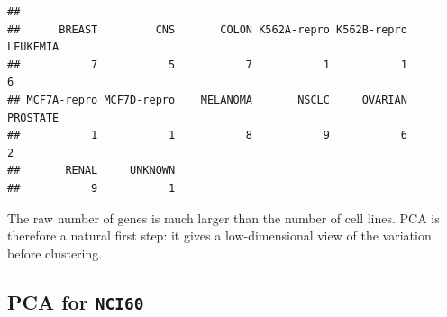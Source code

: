 \documentclass[
  11pt,
]{article}
\newenvironment{Shaded}{\begin{snugshade}}{\end{snugshade}}
\newcommand{\AttributeTok}[1]{\textcolor[rgb]{0.13,0.29,0.53}{#1}}
\newcommand{\ConstantTok}[1]{\textcolor[rgb]{0.56,0.35,0.01}{#1}}
\newcommand{\FunctionTok}[1]{\textcolor[rgb]{0.13,0.29,0.53}{\textbf{#1}}}
\newcommand{\NormalTok}[1]{#1}
\newcommand{\OtherTok}[1]{\textcolor[rgb]{0.56,0.35,0.01}{#1}}
\newcommand{\SpecialCharTok}[1]{\textcolor[rgb]{0.81,0.36,0.00}{\textbf{#1}}}
\begin{document}
\begin{verbatim}
## 
##      BREAST         CNS       COLON K562A-repro K562B-repro    LEUKEMIA 
##           7           5           7           1           1           6 
## MCF7A-repro MCF7D-repro    MELANOMA       NSCLC     OVARIAN    PROSTATE 
##           1           1           8           9           6           2 
##       RENAL     UNKNOWN 
##           9           1
\end{verbatim}

The raw number of genes is much larger than the number of cell lines.
PCA is therefore a natural first step: it gives a low-dimensional view
of the variation before clustering.

\subsection{\texorpdfstring{PCA for
\texttt{NCI60}}{PCA for NCI60}}\label{pca-for-nci60}

\begin{Shaded}
\end{Shaded}
\end{document}
